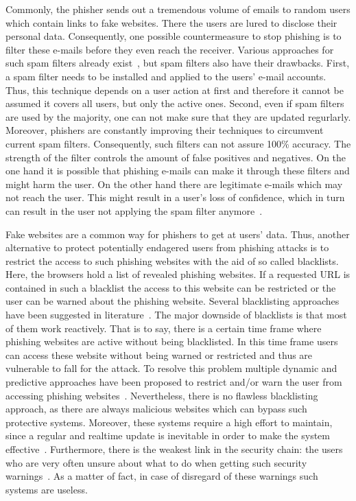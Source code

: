 \begin{description}[leftmargin=0cm]
	\item[Spam filters] Commonly, the phisher sends out a tremendous volume of emails to random users which contain links to fake websites. There the users are lured to disclose their personal data. Consequently, one possible countermeasure to stop phishing is to filter these e-mails before they even reach the receiver. Various approaches for such spam filters already exist~\cite{bergholz2010new,chandrasekaran2006phishing,fette2007learning}, but spam filters also have their drawbacks. First, a spam filter needs to be installed and applied to the users' e-mail accounts. Thus, this technique depends on a user action at first and therefore it cannot be assumed it covers all users, but only the active ones. Second, even if spam filters are used by the majority, one can not make sure that they are updated regurlarly. Moreover, phishers are constantly improving their techniques to circumvent current spam filters. Consequently, such filters can not assure 100\% accuracy. The strength of the filter controls the amount of false positives and negatives. On the one hand it is possible that phishing e-mails can make it through these filters and might harm the user. On the other hand there are legitimate e-mails which may not reach the user. This might result in a user's loss of confidence, which in turn can result in the user not applying the spam filter anymore~\cite{olivo2011obtaining}.
	\item[Blacklists] Fake websites are a common way for phishers to get at users' data. Thus, another alternative to protect potentially endagered users from phishing attacks is to restrict the access to such phishing websites with the aid of so called blacklists. Here, the browsers hold a list of revealed phishing websites. If a requested URL is contained in such a blacklist the access to this website can be restricted or the user can be warned about the phishing website. Several blacklisting approaches have been suggested in literature~\cite{ma2009beyond, zhang2008highly}. The major downside of blacklists is that most of them work reactively. That is to say, there is a certain time frame where phishing websites are active without being blacklisted. In this time frame users can access these website without being warned or restricted and thus are vulnerable to fall for the attack. To resolve this problem multiple dynamic and predictive approaches have been proposed to restrict and/or warn the user from accessing phishing websites~\cite{prakash2010phishnet, obied2009fraudulent}. Nevertheless, there is no flawless blacklisting approach, as there are always malicious websites which can bypass such protective systems. Moreover, these systems require a high effort to maintain, since a regular and realtime update is inevitable in order to make the system effective~\cite{purkait2012phishing}. Furthermore, there is the weakest link in the security chain: the users who are very often unsure about what to do when getting such security warnings~\cite{bakhshi2009social}. As a matter of fact, in case of disregard of these warnings such systems are useless.

\end{description}
